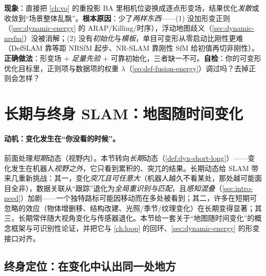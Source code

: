\begin{pitfall}
\textbf{现象}：直接把 \cref{ch:vo} 的重投影 BA 里相机位姿换成逐点形变场，结果优化\emph{发散}或收敛到“场景整体乱飘”。\textbf{根本原因}：少了\emph{两样东西}——(1) 没加形变正则（\cref{sec:dynamic-energy} 的 ARAP/Killing/时序），浮动地图歧义（\cref{sec:dynamic-nrsfm}）没被消解；(2) 没有\emph{初始化}与\emph{模板}，单目可变形从零启动比刚性更难（DefSLAM 靠等距 NRSfM 起步、NR-SLAM 靠刚性 SfM 给初值再切非刚性）。\textbf{正确做法}：形变场 $+$ \emph{足量先验} $+$ 可靠初始化，三者缺一不可。\textbf{自检}：你的可变形优化目标里，正则项与数据项的权重 $\lambda$（\cref{eq:def-fusion-energy}）调过吗？去掉正则会怎样？
\end{pitfall}

\section{长期与终身 SLAM：地图随时间变化}
\label{sec:dynamic-longterm}

\paragraph{动机：变化发生在“你没看的时候”。}
前面处理\emph{短期}动态（视野内）。本节转向\emph{长期}动态（\cref{def:dyn-short-long}）——变化发生在机器人\emph{视野之外}，它只看到累积的、突兀的结果。长期动态给 SLAM 带来几重新挑战\cite{schmid2026dynamic}：其一，变化\emph{突兀且可任意大}（机器人越久不看某处，那处越可能面目全非），数据关联从“跟踪”退化为\emph{全局重识别与匹配}，且\emph{感知混叠}（\cref{sec:intro-need}）加剧——一个独特路标可能因移动而在多处被看到；其二，许多在短期可忽略的效应（物体增删移、结构改建、光照/季节/纹理变化）在长期变得显著；其三，长期常伴随大视角变化与传感器退化。本节给一套关于“地图随时间变化”的概念框架与可识别性论证，并把它与 \cref{ch:loop} 的回环、\cref{sec:dynamic-energy} 的形变接口对齐。

\subsection{终身定位：在变化中认出同一处地方}
\label{sec:dynamic-lifelong-loc}

